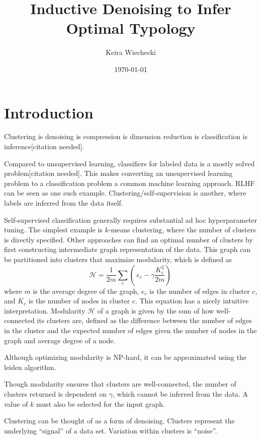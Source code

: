 \documentclass{article}
\title{Inductive Denoising to Infer Optimal Typology}
\author{Keira Wiechecki}
\date{\today}
\begin{document}
\section{Introduction}

Clustering is denoising is compression is dimension reduction is classification is inference[citation needed].

Compared to unsupervised learning, classifiers for labeled data is a mostly solved problem[citation needed].
This makes converting an unsupervised learning problem to a classification problem a common machine learning approach. RLHF can be seen as one such example. 
Clustering/self-supervision is another, where labels are inferred from the data itself.

Self-supervised classification generally requires substantial ad hoc hyperparameter tuning.
The simplest example is $k$-means clustering, where the number of clusters is directly specified.
Other approaches can find an optimal number of clusters by first constructing intermediate graph representation of the data.
This graph can be partitioned into clusters that maximize modularity\cite{PhysRevE.74.016110}, which is defined as 
\begin{equation}
 \mathcal{H} = \frac{1}{2m}\sum_{c}( \,e_c - \gamma\frac{K_c^2}{2m}) \, 
\end{equation}
where $m$ is the average degree of the graph, $e_c$ is the number of edges in cluster $c$, and $K_c$ is the number of nodes in cluster $c$.
This equation has a nicely intuitive interpretation. Modularity $\mathcal{H}$ of a graph is given by the sum of how well-connected its clusters are,
defined as the difference between the number of edges in the cluster and the expected number of edges given the number of nodes in the graph and average degree of a node.

Although optimizing modularity is NP-hard, it can be approximated using the leiden algorithm\cite{traag2019louvain}.

Though modularity ensures that clusters are well-connected, the number of clusters returned is dependent on $\gamma$, which cannot be inferred from the data. A value of $k$ must also be selected for the input graph.

Clustering can be thought of as a form of denoising. Clusters represent the underlying ``signal'' of a data set. Variation within clusters is ``noise''.
\end{document}
